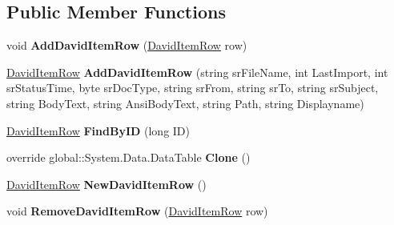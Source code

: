 \subsection*{Public Member Functions}
\begin{DoxyCompactItemize}
\item 
void {\bfseries Add\+David\+Item\+Row} (\hyperlink{class_products_1_1_data_1_1ds_sage_1_1_david_item_row}{David\+Item\+Row} row)\hypertarget{class_products_1_1_data_1_1ds_sage_1_1_david_item_data_table_a27c8d357915f101944736ca464b29c32}{}\label{class_products_1_1_data_1_1ds_sage_1_1_david_item_data_table_a27c8d357915f101944736ca464b29c32}

\item 
\hyperlink{class_products_1_1_data_1_1ds_sage_1_1_david_item_row}{David\+Item\+Row} {\bfseries Add\+David\+Item\+Row} (string sr\+File\+Name, int Last\+Import, int sr\+Status\+Time, byte sr\+Doc\+Type, string sr\+From, string sr\+To, string sr\+Subject, string Body\+Text, string Ansi\+Body\+Text, string Path, string Displayname)\hypertarget{class_products_1_1_data_1_1ds_sage_1_1_david_item_data_table_a49049ba4d576fec70f85bdf99c8ac1c0}{}\label{class_products_1_1_data_1_1ds_sage_1_1_david_item_data_table_a49049ba4d576fec70f85bdf99c8ac1c0}

\item 
\hyperlink{class_products_1_1_data_1_1ds_sage_1_1_david_item_row}{David\+Item\+Row} {\bfseries Find\+By\+ID} (long ID)\hypertarget{class_products_1_1_data_1_1ds_sage_1_1_david_item_data_table_a76d9a13ff968df2e98e0addd9a8a694b}{}\label{class_products_1_1_data_1_1ds_sage_1_1_david_item_data_table_a76d9a13ff968df2e98e0addd9a8a694b}

\item 
override global\+::\+System.\+Data.\+Data\+Table {\bfseries Clone} ()\hypertarget{class_products_1_1_data_1_1ds_sage_1_1_david_item_data_table_a308688a30921d369d421e663bbf087bb}{}\label{class_products_1_1_data_1_1ds_sage_1_1_david_item_data_table_a308688a30921d369d421e663bbf087bb}

\item 
\hyperlink{class_products_1_1_data_1_1ds_sage_1_1_david_item_row}{David\+Item\+Row} {\bfseries New\+David\+Item\+Row} ()\hypertarget{class_products_1_1_data_1_1ds_sage_1_1_david_item_data_table_aed2d513f26584089c9762169db6b8c77}{}\label{class_products_1_1_data_1_1ds_sage_1_1_david_item_data_table_aed2d513f26584089c9762169db6b8c77}

\item 
void {\bfseries Remove\+David\+Item\+Row} (\hyperlink{class_products_1_1_data_1_1ds_sage_1_1_david_item_row}{David\+Item\+Row} row)\hypertarget{class_products_1_1_data_1_1ds_sage_1_1_david_item_data_table_a840413cfd0d6d6459dd33414cb4e260c}{}\label{class_products_1_1_data_1_1ds_sage_1_1_david_item_data_table_a840413cfd0d6d6459dd33414cb4e260c}

\end{DoxyCompactItemize}
